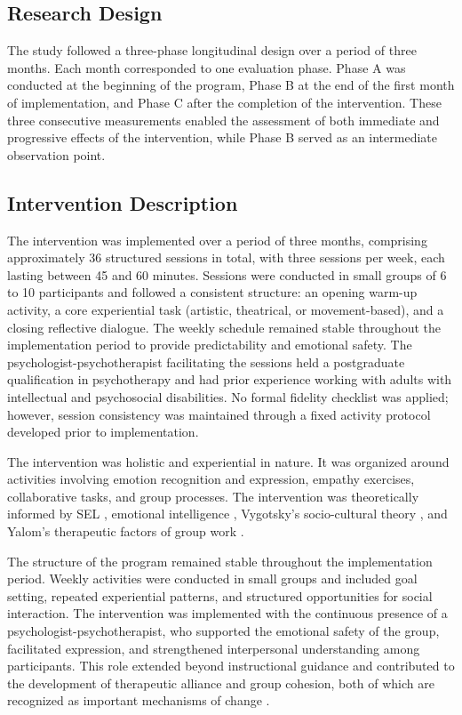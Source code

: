 \documentclass[journal]{IEEEtran}
\begin{document}
\subsection{Research Design}

The study followed a three-phase longitudinal design over a period of three months. Each month corresponded to one evaluation phase. Phase A was conducted at the beginning of the program, Phase B at the end of the first month of implementation, and Phase C after the completion of the intervention. These three consecutive measurements enabled the assessment of both immediate and progressive effects of the intervention, while Phase B served as an intermediate observation point.

\subsection{Intervention Description}

The intervention was implemented over a period of three months,
comprising approximately 36 structured sessions in total, with
three sessions per week, each lasting between 45 and 60 minutes.
Sessions were conducted in small groups of 6 to 10 participants
and followed a consistent structure: an opening warm-up activity,
a core experiential task (artistic, theatrical, or movement-based),
and a closing reflective dialogue. The weekly schedule remained
stable throughout the implementation period to provide predictability
and emotional safety. The psychologist-psychotherapist facilitating
the sessions held a postgraduate qualification in psychotherapy and
had prior experience working with adults with intellectual and
psychosocial disabilities. No formal fidelity checklist was applied;
however, session consistency was maintained through a fixed
activity protocol developed prior to implementation.

The intervention was holistic and experiential in nature. It was organized around activities involving emotion recognition and expression, empathy exercises, collaborative tasks, and group processes. The intervention was theoretically informed by SEL \cite{casel2020}, emotional intelligence \cite{goleman1995}, Vygotsky's socio-cultural theory \cite{vygotsky1978}, and Yalom's therapeutic factors of group work \cite{yalom2005}.

The structure of the program remained stable throughout the implementation period. Weekly activities were conducted in small groups and included goal setting, repeated experiential patterns, and structured opportunities for social interaction. The intervention was implemented with the continuous presence of a psychologist-psychotherapist, who supported the emotional safety of the group, facilitated expression, and strengthened interpersonal understanding among participants. This role extended beyond instructional guidance and contributed to the development of therapeutic alliance and group cohesion, both of which are recognized as important mechanisms of change \cite{norcross2018,burlingame2011}.
\end{document}
